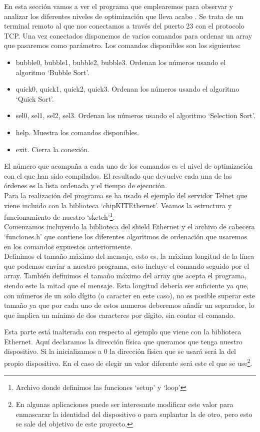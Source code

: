 En esta sección vamos a ver el programa que emplearemos para observar y analizar los diferentes niveles de optimización que lleva acabo . Se trata de un terminal remoto al que nos conectamos a través del puerto 23 con el protocolo TCP. Una vez conectados disponemos de varios comandos para ordenar un array que pasaremos como parámetro. Los comandos disponibles son los siguientes:

\begin{itemize}
	\item bubble0, bubble1, bubble2, bubble3. Ordenan los números usando el algoritmo `Bubble Sort'.
	\item quick0, quick1, quick2, quick3. Ordenan los números usando el algoritmo `Quick Sort'.
	\item sel0, sel1, sel2, sel3. Ordenan los números usando el algoritmo `Selection Sort'.
	\item help. Muestra los comandos disponibles.
	\item exit. Cierra la conexión.
\end{itemize}

El número que acompaña a cada uno de los comandos es el nivel de optimización con el que han sido compilados. El resultado que devuelve cada una de las órdenes es la lista ordenada y el tiempo de ejecución.\\
Para la realización del programa se ha usado el ejemplo del servidor Telnet que viene incluido con la biblioteca `chipKITEthernet'. Veamos la estructura y funcionamiento de nuestro `sketch'\footnote{Archivo donde definimos las funciones `setup' y `loop'}.\\

Comenzamos incluyendo la biblioteca del shield Ethernet y el archivo de cabecera `funciones.h' que contiene los diferentes algoritmos de ordenación que usaremos en los comandos expuestos anteriormente.\\


Definimos el tamaño máximo del mensaje, esto es, la máxima longitud de la línea que podemos envíar a nuestro programa, esto incluye el comando seguido por el array. También definimos el tamaño máximo del array que acepta el programa, siendo este la mitad que el mensaje. Esta longitud debería ser suficiente ya que, con números de un solo dígito (o caracter en este caso), no es posible superar este tamaño ya que por cada uno de estos numeros deberemos añadir un separador, lo que implica un mínimo de dos caracteres por dígito, sin contar el comando.


Esta parte está inalterada con respecto al ejemplo que viene con la biblioteca Ethernet. Aquí declaramos la dirección física que queramos que tenga nuestro dispositivo. Si la inicializamos a 0 la dirección física que se usará será la del propio dispositivo. En el caso de elegir un valor diferente será este el que se use\footnote{En algunas aplicaciones puede ser interesante modificar este valor para enmascarar la identidad del dispositivo o para suplantar la de otro, pero esto se sale del objetivo de este proyecto.}.
